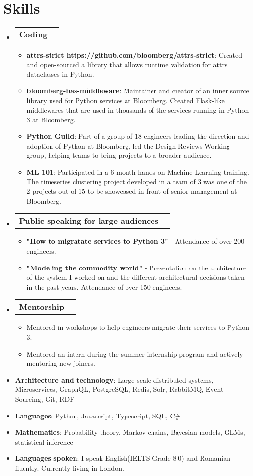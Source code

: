 \documentclass[letterpaper,11pt]{article}
\makeatletter
\newcommand{\resumeItem}[2]{
  \item\small{
    \textbf{#1}{: #2 \vspace{-1pt}}
  }
}
\newcommand{\workItem}[2]{
  \item\small{
    \textbf{#1}{#2 \vspace{-0.6pt}}
  }
}
\newcommand{\resumeCoding}[1]{
  \vspace{-1pt}\item
    \begin{tabular*}{0.97\textwidth}{l@{\extracolsep{\fill}}r}
      \textbf{#1} \\      
    \end{tabular*}\vspace{-5pt}
}
\newcommand{\resumeSubHeadingListStart}{\begin{itemize}[leftmargin=*]}
\newcommand{\resumeSubHeadingListEnd}{\end{itemize}}
\newcommand{\resumeItemListStart}{\begin{itemize}}
\newcommand{\resumeItemListEnd}{\end{itemize}\vspace{-4.6pt}}
\makeatother
\begin{document}
\section{Skills}
 \resumeSubHeadingListStart
    \resumeCoding {Coding}
      \resumeItemListStart
        \resumeItem {attrs-strict https://github.com/bloomberg/attrs-strict}
        {Created and open-sourced a library that allows runtime validation for attrs dataclasses in Python.}
        \resumeItem {bloomberg-bas-middleware}
        {Maintainer and creator of an inner source library used for Python services at Bloomberg. Created Flask-like middlewares that are used in thousands of the services running in Python 3 at Bloomberg.}
        \resumeItem {Python Guild}
        {Part of a group of 18 engineers leading the direction and adoption of Python at Bloomberg, led the Design Reviews Working group, helping teams to bring projects to a broader audience.}
        \resumeItem {ML 101}
        {Participated in a 6 month hands on Machine Learning training. The timeseries clustering project developed in a team of 3 was one of the 2 projects out of 15 to be showcased in front of senior management at Bloomberg.}  
      \resumeItemListEnd
    \resumeCoding {Public speaking for large audiences}
      \resumeItemListStart
        \workItem{}
        {\textbf{"How to migratate services to Python 3"} -  Attendance of over 200 engineers.}
        \workItem{}
        {\textbf{"Modeling the commodity world"} - Presentation on the architecture of the system I worked on and the different architectural decisions taken in the past years. Attendance of over 150 engineers.}
      \resumeItemListEnd
    \resumeCoding {Mentorship}
      \resumeItemListStart
        \workItem{}
        {Mentored in workshops to help engineers migrate their services to Python 3.}
        \workItem{}
        {Mentored an intern during the summer internship program and actively mentoring new joiners.}
      \resumeItemListEnd
   \item{
     \textbf{Architecture and technology}{: Large scale distributed systems, Microservices, GraphQL, PostgreSQL, Redis, Solr, RabbitMQ, Event Sourcing, Git, RDF}
   }
   \item{
     \textbf{Languages}{: Python, Javascript, Typescript, SQL, C\#}
   }
   \item{
     \textbf{Mathematics}{: Probability theory, Markov chains, Bayesian models, GLMs, statistical inference}
   }
   \item{
     \textbf{Languages spoken}{: I speak English(IELTS Grade 8.0) and Romanian fluently. Currently living in London.}
   }   	
 \resumeSubHeadingListEnd
\end{document}
